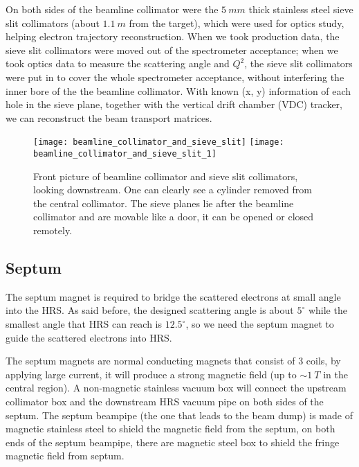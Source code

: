 On both sides of the beamline collimator were the $5\ mm$ thick stainless steel
sieve slit collimators (about $1.1\ m$ from the target), which    %
were used for optics study, helping electron trajectory reconstruction. When
we took production data, the sieve slit collimators were moved out of the spectrometer
acceptance; when we took optics data to measure the scattering angle and $Q^2$,
the sieve slit collimators were put in to cover the whole spectrometer acceptance,
without interfering the inner bore of the the beamline collimator. With known
(x, y) information of each hole in the sieve plane, together with the vertical
drift chamber (VDC) tracker, we can reconstruct the beam transport matrices.
\begin{figure}[h!]
    \centering
    \texttt{[image: beamline\_collimator\_and\_sieve\_slit]}
    \hspace{1cm}
    \texttt{[image: beamline\_collimator\_and\_sieve\_slit\_1]}
    \caption{Front picture of beamline collimator and sieve slit collimators, looking 
    downstream. One can clearly see a cylinder removed from the central collimator.
    The sieve planes lie after the beamline collimator and are movable like
    a door, it can be opened or closed remotely.}
\end{figure}

\subsection{Septum}
The septum magnet is required to bridge the scattered electrons at small angle
into the HRS. As said before, the designed scattering angle is about $5^\circ$
while the smallest angle that HRS can reach is $12.5^\circ$, so we need the septum
magnet to guide the scattered electrons into HRS. 

The septum magnets are normal conducting magnets that consist of 3 coils, 
by applying large current, it will produce a
strong magnetic field (up to $\sim 1 \ T$ in the central region). A non-magnetic
stainless vacuum box will connect the upstream collimator box and the downstream 
HRS vacuum pipe on both sides of the septum. The septum beampipe (the one that
leads to the beam dump) is made of magnetic stainless steel to shield the
magnetic field from the septum, on both ends of the septum beampipe, there
are magnetic steel box to shield the fringe magnetic field from septum. 

